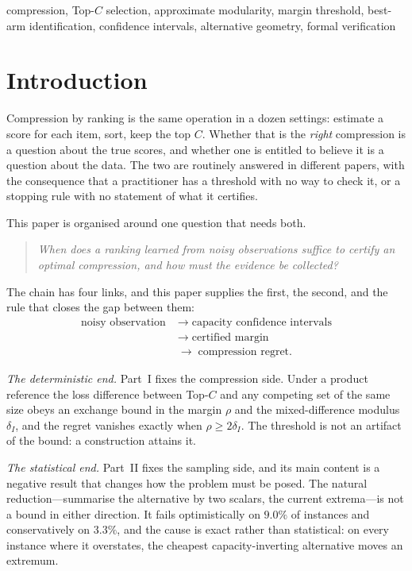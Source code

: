 \documentclass[conference]{IEEEtran}
\theoremstyle{definition}
\begin{document}
\begin{IEEEkeywords}
compression, Top-$C$ selection, approximate modularity, margin threshold,
best-arm identification, confidence intervals, alternative geometry, formal verification
\end{IEEEkeywords}

\section{Introduction}

Compression by ranking is the same operation in a dozen settings: estimate a score for each
item, sort, keep the top $C$. Whether that is the \emph{right} compression is a question
about the true scores, and whether one is entitled to believe it is a question about the data.
The two are routinely answered in different papers, with the consequence that a practitioner
has a threshold with no way to check it, or a stopping rule with no statement of what it
certifies.

This paper is organised around one question that needs both.

\begin{quote}
\emph{When does a ranking learned from noisy observations suffice to certify an optimal
compression, and how must the evidence be collected?}
\end{quote}

The chain has four links, and this paper supplies the first, the second, and the rule that
closes the gap between them:
\[
\begin{aligned}
\text{noisy observation}
&\;\longrightarrow\;\text{capacity confidence intervals}\\
&\;\longrightarrow\;\text{certified margin}\\
&\;\longrightarrow\;\text{compression regret}.
\end{aligned}
\]

\emph{The deterministic end.} Part~I fixes the compression side. Under a product reference the
loss difference between Top-$C$ and any competing set of the same size obeys an exchange
bound in the margin $\rho$ and the mixed-difference modulus $\delta_{I}$, and the regret
vanishes exactly when $\rho\ge2\delta_{I}$. The threshold is not an artifact of the bound:
a construction attains it.

\emph{The statistical end.} Part~II fixes the sampling side, and its main content is a
negative result that changes how the problem must be posed. The natural reduction---summarise
the alternative by two scalars, the current extrema---is not a bound in either direction. It
fails optimistically on $9.0\%$ of instances and conservatively on $3.3\%$, and the cause is
exact rather than statistical: on every instance where it overstates, the cheapest
capacity-inverting alternative moves an extremum.
\end{document}
